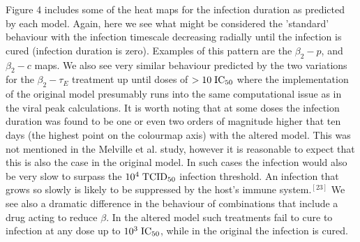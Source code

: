 \documentclass[a4paper,11pt]{article}
\begin{document}
Figure 4 includes some of the heat maps for the infection duration as predicted by each model. Again, here we see what might be considered the 'standard' behaviour with the infection timescale decreasing radially until the infection is cured (infection duration is zero). Examples of this pattern are the $\beta_2-p$, and $\beta_2-c$ maps. We also see very similar behaviour predicted by the two variations for the $\beta_2-\tau_E$ treatment up until doses of $>  10 \hspace{1mm} \mathrm{IC}_{50}$ where the implementation of the original model presumably runs into the same computational issue as in the viral peak calculations. It is worth noting that at some doses the infection duration was found to be one or even two orders of magnitude higher that ten days (the highest point on the colourmap axis) with the altered model. This was not mentioned in the Melville et al. study, however it is reasonable to expect that this is also the case in the original model. In such cases the infection would also be very slow to surpass the $10^4 \hspace{1mm} \mathrm{TCID}_{50}$ infection threshold. An infection that grows so slowly is likely to be suppressed by the host's immune system.$^{[23]}$ We see also a dramatic difference in the behaviour of combinations that include a drug acting to reduce $\beta$. In the altered model such treatments fail to cure to infection at any dose up to $10^3 \hspace{1mm} \mathrm{IC}_{50}$, while in the original the infection is cured.
\end{document}
